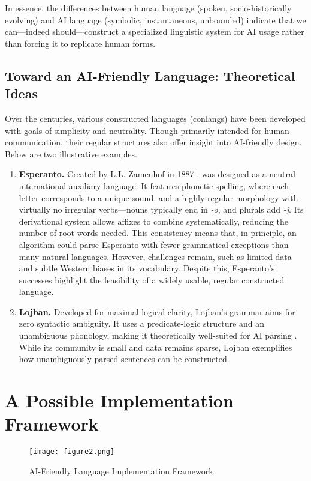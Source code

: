 \documentclass{article} %
\begin{document}
In essence, the differences between human language (spoken, socio-historically evolving) and AI language (symbolic, instantaneous, unbounded) indicate that we can—indeed should—construct a specialized linguistic system for AI usage rather than forcing it to replicate human forms.

\subsection{Toward an AI-Friendly Language: Theoretical Ideas}
Over the centuries, various constructed languages (conlangs) have been developed with goals of simplicity and neutrality. Though primarily intended for human communication, their regular structures also offer insight into AI-friendly design. Below are two illustrative examples.

\begin{enumerate}
   \item \textbf{Esperanto.} Created by L.L. Zamenhof in 1887 \cite{EsperantoWiki} , was designed as a neutral international auxiliary language. It features phonetic spelling, where each letter corresponds to a unique sound, and a highly regular morphology with virtually no irregular verbs---nouns typically end in \emph{-o}, and plurals add \emph{-j}. Its derivational system allows affixes to combine systematically, reducing the number of root words needed. This consistency means that, in principle, an algorithm could parse Esperanto with fewer grammatical exceptions than many natural languages. However, challenges remain, such as limited data and subtle Western biases in its vocabulary. Despite this, Esperanto's successes highlight the feasibility of a widely usable, regular constructed language.
   
   \item \textbf{Lojban.} Developed for maximal logical clarity, Lojban's grammar aims for zero syntactic ambiguity. It uses a predicate-logic structure and an unambiguous phonology, making it theoretically well-suited for AI parsing \citep{LogicalLanguageGroup}. While its community is small and data remains sparse, Lojban exemplifies how unambiguously parsed sentences can be constructed.
\end{enumerate}

\section{A Possible Implementation Framework}

\begin{figure}[h]
    \centering
    \texttt{[image: figure2.png]}
    \caption{AI-Friendly Language Implementation Framework}
    \label{fig:implementation-framework}
\end{figure}
\end{document}
